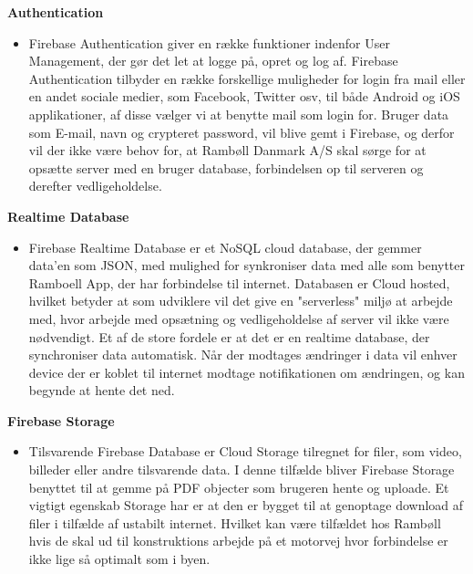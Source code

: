\textbf{Authentication\cite{FirebaseAuth}}
\begin{itemize}[-]
	\itemsep 0.3em 
	\item[] Firebase Authentication giver en række funktioner indenfor User Management, der gør det let at logge på, opret og log af. Firebase Authentication tilbyder en række forskellige muligheder for login fra mail eller en andet sociale medier, som Facebook, Twitter osv, til både Android og iOS applikationer, af disse vælger vi at benytte mail som login for. Bruger data som E-mail, navn og crypteret password, vil blive gemt i Firebase, og derfor vil der ikke være behov for, at Rambøll Danmark A/S skal sørge for at opsætte server med en bruger database, forbindelsen op til serveren og derefter vedligeholdelse. 
	
\end{itemize}	
\textbf{Realtime Database\cite{FirebaseRealtimeDB}}
\begin{itemize}[-]
	\itemsep 0.3em 
	\item[]  Firebase Realtime Database er et NoSQL cloud database, der gemmer data'en som JSON\cite{JSON}, med mulighed for synkroniser data med alle som benytter Ramboell App, der har forbindelse til internet. Databasen er Cloud hosted, hvilket betyder at som udviklere vil det give en "serverless" miljø at arbejde med, hvor arbejde med opsætning og vedligeholdelse af server vil ikke være nødvendigt. Et af de store fordele er at det er en realtime database, der synchroniser data automatisk. Når der modtages ændringer i data vil enhver device der er koblet til internet modtage notifikationen om ændringen, og kan begynde at hente det ned. 
\end{itemize}
\textbf{Firebase Storage\cite{FirebaseStorage}}
\begin{itemize}[-]
	\itemsep 0.3em 
	\item[] Tilsvarende Firebase Database er Cloud Storage tilregnet for filer, som video, billeder eller andre tilsvarende data. I denne tilfælde bliver Firebase Storage benyttet til at gemme på PDF objecter som brugeren hente og uploade. Et vigtigt egenskab Storage har er at den er bygget til at genoptage download af filer i tilfælde af ustabilt internet. Hvilket kan være tilfældet hos Rambøll hvis de skal ud til konstruktions arbejde på et motorvej hvor forbindelse er ikke lige så optimalt som i byen. 
\end{itemize}


\clearpage